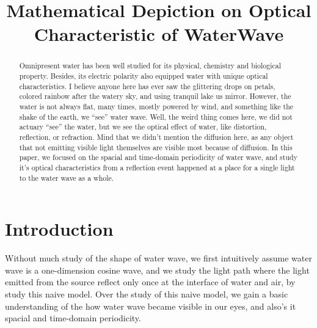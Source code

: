 \documentclass[conference]{IEEEtran}
\begin{document}
\title{Mathematical Depiction on Optical Characteristic of WaterWave
}

\author{
\and
{}
\and
{}
}

\maketitle

\begin{abstract}
Omnipresent water has been well studied for its physical, chemistry and biological property. Besides, its electric polarity also equipped water with unique optical characteristics. I believe anyone here has ever saw the glittering drops on petals, colored rainbow after the watery sky, and using tranquil lake us mirror. However, the water is not always flat, many times, mostly powered by wind, and something like the shake of the earth, we “see” water wave. Well, the weird thing comes here, we did not actuary “see” the water, but we see the optical effect of water, like distortion, reflection, or refraction. Mind that we didn’t mention the diffusion here, as any object that not emitting visible light themselves are visible most because of diffusion. In this paper, we focused on the spacial and time-domain periodicity of water wave, and study it’s optical characteristics from a reflection event happened at a place for a single light to the water wave as a whole.
\end{abstract}


\section{Introduction}
Without much study of the shape of water wave, we first intuitively assume water wave is a one-dimension cosine wave, and we study the light path where the light emitted from the source reflect only once at the interface of water and air, by study this naive model. Over the study of this naive model, we gain a basic understanding of the how water wave became visible in our eyes, and also’s it spacial and time-domain periodicity.\\
\end{document}
